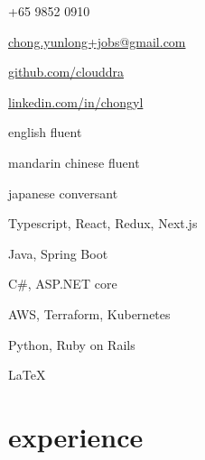 \documentclass[]{cv} %
\begin{document}
\addstretch{\abovedisplayskip}
\addstretch{\abovedisplayshortskip}
\addstretch{\belowdisplayskip}
\addstretch{\belowdisplayshortskip}
\setlength{\parskip}{0pt}



\begin{multicols}{3}

\begin{infoitemize}
\item +65 9852 0910
\item \href{mailto:chong.yunlong+jobs@gmail.com}{chong.yunlong+jobs@gmail.com}
\item \href{https://github.com/clouddra}{github.com/clouddra}
\item \href{https://sg.linkedin.com/in/chongyl}{linkedin.com/in/chongyl}
\end{infoitemize}
\vspace*{\fill}
\columnbreak
{}
\begin{infoitemize}
\item english \to fluent
\item mandarin chinese \to fluent
\item japanese \to conversant
\end{infoitemize}
\vspace*{\fill}
\columnbreak
{}
\begin{infoitemize}
\item Typescript, React, Redux, Next.js
\item Java, Spring Boot
\item C\#, ASP.NET core
\item AWS, Terraform, Kubernetes
\item Python, Ruby on Rails
\item \LaTeX
\end{infoitemize}
\end{multicols}

\vspace{-1\parsep}


\section{experience}
\addstretch{\baselineskip}
\end{document}

